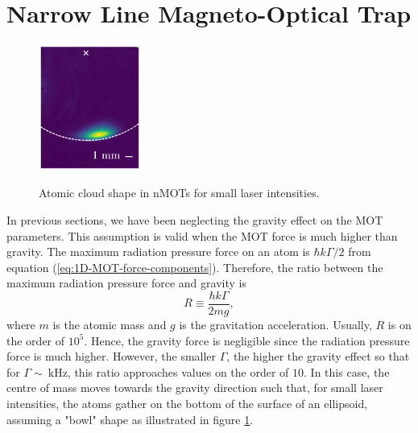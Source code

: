 %
\newpage
\section{Narrow Line Magneto-Optical Trap}
%

\begin{figure}
    \centering
    \vspace{-10px}
    \caption{Atomic cloud shape in nMOTs for small laser intensities.}
    \includegraphics[width=0.3\textwidth]{USPSC-img/atomic_cloud_shape_in_nMOTs.png}
    \label{fig:atomic-cloud-shape-nMOTs}
    \vspace{-10px}
\end{figure}

In previous sections, we have been neglecting the gravity effect on the MOT parameters. This assumption is valid when the MOT force is much higher than gravity. The maximum radiation pressure force on an atom is $ \hbar k \Gamma / 2 $ from equation (\ref{eq:1D-MOT-force-components}). Therefore, the ratio between the maximum radiation pressure force and gravity is
\begin{equation}
    R \equiv \frac{\hbar k \Gamma}{2 m g},
\end{equation}
where $ m $ is the atomic mass and $ g $ is the gravitation acceleration. Usually, $ R $ is on the order of $ 10^5 $. Hence, the gravity force is negligible since the radiation pressure force is much higher. However, the smaller $ \Gamma $, the higher the gravity effect so that for $ \Gamma \sim\ \textrm{kHz} $, this ratio approaches values on the order of $ 10 $. In this case, the centre of mass moves towards the gravity direction such that, for small laser intensities, the atoms gather on the bottom of the surface of an ellipsoid, assuming a "bowl" shape as illustrated in figure \ref{fig:atomic-cloud-shape-nMOTs}.

